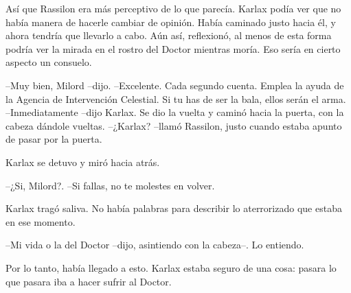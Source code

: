 Así que Rassilon era más perceptivo de lo que parecía. Karlax podía ver que no había manera de hacerle cambiar de opinión. Había caminado justo hacia él, y ahora tendría que llevarlo a cabo. Aún así, reflexionó, al menos de esta forma podría ver la mirada en el rostro del Doctor mientras moría. Eso sería en cierto aspecto un consuelo.

--Muy bien, Milord --dijo.
--Excelente. Cada segundo cuenta. Emplea la ayuda de la Agencia de Intervención Celestial. Si tu has de ser la bala, ellos serán el arma.
--Inmediatamente --dijo Karlax. Se dio la vuelta y caminó hacia la puerta, con la cabeza dándole vueltas.
--¿Karlax? --llamó Rassilon, justo cuando estaba apunto de pasar por la puerta.

Karlax se detuvo y miró hacia atrás. 

--¿Si, Milord?.
--Si fallas, no te molestes en volver.

Karlax tragó saliva. No había palabras para describir lo aterrorizado que estaba en ese momento. 

--Mi vida o la del Doctor --dijo, asintiendo con la cabeza--. Lo entiendo.

Por lo tanto, había llegado a esto. Karlax estaba seguro de una cosa: pasara lo que pasara iba a hacer sufrir al Doctor.

